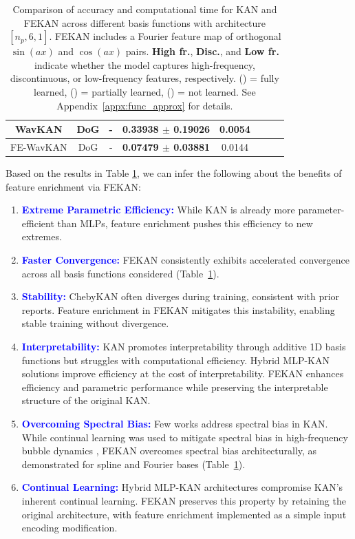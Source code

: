 \documentclass{article}
\newcommand{\cmark}{\textcolor{green}{\ding{51}}} %
\newcommand{\omark}{\textcolor{orange}{\ding{51}}} %
\newcommand{\xmark}{\textcolor{red}{\ding{55}}}   %
\begin{document}
\begin{table}[h!]
{\begin{tabular}{||c||c|c||c|c||c|c|c||}
    WavKAN \cite{bozorgasl2405wav} & DoG & - & 0.33938 $\pm$ 0.19026 & 0.0054 & \xmark & \xmark & \xmark\\ \hline
    FE-WavKAN & DoG & - & \textbf{0.07479 $\pm$ 0.03881} & 0.0144 & \xmark & \cmark & \cmark \\ \hline\hline
    \end{tabular}%
    }
    \caption{Comparison of accuracy and computational time for KAN and FEKAN across different basis functions with architecture $[n_p, 6, 1]$. FEKAN includes a Fourier feature map of orthogonal $\sin(ax)$ and $\cos(ax)$ pairs. \textbf{High fr.}, \textbf{Disc.}, and \textbf{Low fr.} indicate whether the model captures high-frequency, discontinuous, or low-frequency features, respectively. (\cmark) = fully learned, (\omark) = partially learned, (\xmark) = not learned. See Appendix~\ref{appx:func_approx} for details.}
    \label{tab:funfit_compare}
\end{table}
\noindent
Based on the results in Table \ref{tab:funfit_compare}, we can infer the following about the benefits of feature enrichment via FEKAN:
\begin{enumerate}
    \item \textcolor{blue}{\textbf{Extreme Parametric Efficiency:}} While KAN \cite{liu2024kan} is already more parameter-efficient than MLPs, feature enrichment pushes this efficiency to new extremes.  
    \item \textcolor{blue}{\textbf{Faster Convergence:}} FEKAN consistently exhibits accelerated convergence across all basis functions considered (Table~\ref{tab:funfit_compare}).%

     \item \textcolor{blue}{\textbf{Stability:}} ChebyKAN \cite{ss2024chebyshev} often diverges during training, consistent with prior reports. Feature enrichment in FEKAN mitigates this instability, enabling stable training without divergence.  
    \item \textcolor{blue}{\textbf{Interpretability:}} KAN promotes interpretability through additive 1D basis functions but struggles with computational efficiency. Hybrid MLP-KAN solutions improve efficiency at the cost of interpretability. FEKAN enhances efficiency and parametric performance while preserving the interpretable structure of the original KAN.

    \item \textcolor{blue}{\textbf{Overcoming Spectral Bias:}} Few works address spectral bias in KAN. While continual learning was used to mitigate spectral bias in high-frequency bubble dynamics \cite{Zhang2025BubbleOKAN}, FEKAN overcomes spectral bias architecturally, as demonstrated for spline and Fourier bases (Table~\ref{tab:funfit_compare}).  
    \item \textcolor{blue}{\textbf{Continual Learning:}} Hybrid MLP-KAN architectures compromise KAN’s inherent continual learning. FEKAN preserves this property by retaining the original architecture, with feature enrichment implemented as a simple input encoding modification.

\end{enumerate}
\end{document}
